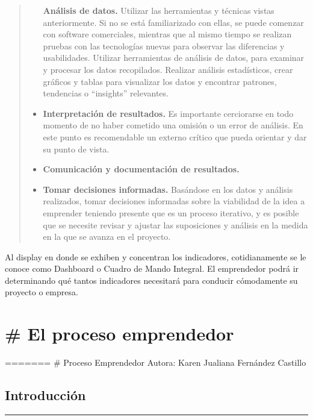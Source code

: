 \documentclass[
  letterpaper,
  DIV=11,
  numbers=noendperiod]{scrreprt}
\begin{document}
\begin{quote}
\begin{itemize}
  \textbf{Análisis de datos.} Utilizar las herramientas y técnicas
  vistas anteriormente. Si no se está familiarizado con ellas, se puede
  comenzar con software comerciales, mientras que al mismo tiempo se
  realizan pruebas con las tecnologías nuevas para observar las
  diferencias y usabilidades. Utilizar herramientas de análisis de
  datos, para examinar y procesar los datos recopilados. Realizar
  análisis estadísticos, crear gráficos y tablas para visualizar los
  datos y encontrar patrones, tendencias o ``insights'' relevantes.
\item
  \textbf{Interpretación de resultados.} Es importante cerciorarse en
  todo momento de no haber cometido una omisión o un error de análisis.
  En este punto es recomendable un externo crítico que pueda orientar y
  dar su punto de vista.
\item
  \textbf{Comunicación y documentación de resultados.}
\item
  \textbf{Tomar decisiones informadas.} Basándose en los datos y
  análisis realizados, tomar decisiones informadas sobre la viabilidad
  de la idea a emprender teniendo presente que es un proceso iterativo,
  y es posible que se necesite revisar y ajustar las suposiciones y
  análisis en la medida en la que se avanza en el proyecto.
\end{itemize}
\end{quote}

Al display en donde se exhiben y concentran los indicadores,
cotidianamente se le conoce como Dashboard o Cuadro de Mando Integral.
El emprendedor podrá ir determinando qué tantos indicadores necesitará
para conducir cómodamente su proyecto o empresa.


\hypertarget{el-proceso-emprendedor}{%
\chapter{\texorpdfstring{\textbf{\# El proceso
emprendedor}}{\# El proceso emprendedor}}\label{el-proceso-emprendedor}}

======= \# Proceso Emprendedor Autora: Karen Jualiana Fernández Castillo

\hypertarget{introducciuxf3n-1}{%
\section{Introducción}\label{introducciuxf3n-1}}

\begin{center}\rule{0.5\linewidth}{0.5pt}\end{center}
\end{document}
